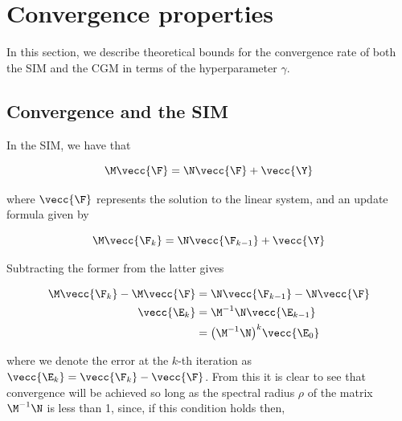 \begin{algorithm}[t]
\begin{algorithmic}
        \vspace{0.15cm}
        \vspace{0.15cm}
        \vspace{0.15cm}
        \State{$\D \leftarrow  \RR + \delta \D $}
        \vspace{0.15cm}
        \EndWhile
        \vspace{0.25cm}
        \vspace{0.15cm}
    \end{algorithmic}
\end{algorithm}


\section{Convergence properties}

\label{sec:convergence}


In this section, we describe theoretical bounds for the convergence rate of both the SIM and the CGM in terms of the hyperparameter $\gamma$. 

\subsection{Convergence and the SIM}
\label{sec:SIM_convergence}

In the SIM, we have that 

$$
\M \vecc{\F} =  \N \vecc{\F} + \vecc{\Y}
$$

where $\vecc{\F}$ represents the solution to the linear system, and an update formula given by 

$$
\M \vecc{\F_k} = \N \vecc{\F_{k-1}} + \vecc{\Y}
$$

Subtracting the former from the latter gives

\begin{align}
    \M \vecc{\F_k} - \M \vecc{\F} &= \N \vecc{\F_{k-1}} - \N \vecc{\F}  \notag \\
    \vecc{\E_k} &= \M^{-1} \N \vecc{\E_{k-1}} \notag \\
     &= \big( \M^{-1} \N \big)^{k} \vecc{\E_{0}}
\end{align}

where we denote the error at the $k$-th iteration as $\vecc{\E_k} = \vecc{\F_k} - \vecc{\F}$. From this it is clear to see that convergence will be achieved so long as the spectral radius $\rho$ of the matrix $\M^{-1} \N$ is less than 1, since, if this condition holds then,

